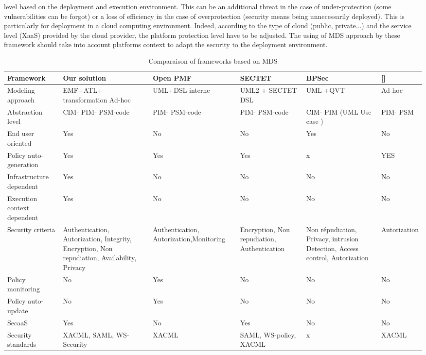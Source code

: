 \documentclass[runningheads,a4paper]{llncs}
\begin{document}
level based on the deployment and execution environment. This can be an additional threat in the case of under-protection (some vulnerabilities can be forgot) or a loss of efficiency in the case of overprotection (security means being unnecessarily deployed). This is particularly for deployment in a cloud computing environment. Indeed, according to the type of cloud (public, private...) and the service level (XaaS) provided by the cloud provider, the platform protection level have to be adjusted. The using of MDS approach by these framework should take into account platforms context to adapt the security to the deployment environment.


\begin{landscape}
\begin{table}

\caption{Comparaison of frameworks based on MDS}
\begin{tabular}{@{}*{6}{|p{3.1cm}}|@{} }
\hline\noalign{\smallskip}
Framework & Our solution   & Open PMF & SECTET & BPSec & []\\[0.2cm]
  \hline
  Modeling approach & EMF+ATL+ transformation Ad-hoc  & UML+DSL interne & UML2 + SECTET DSL & UML +QVT & Ad hoc\\
  Abstraction level & CIM- PIM- PSM-code  &  PIM- PSM-code  &  PIM- PSM-code &  CIM- PIM (UML Use case )&  PIM- PSM\\
  End user oriented & Yes & No & No & Yes & No\\
  Policy auto-generation & Yes & Yes & Yes & x & YES\\
  Infrastructure dependent & Yes & No & No & No & No\\
  Execution context dependent & Yes & No & No & No & No\\
  Security criteria &  Authentication, Autorization,  Integrity, Encryption, Non repudiation, Availability, Privacy & Authentication, Autorization,Monitoring & Encryption, Non repudiation, Authentication & Non  r\'epudiation, 
Privacy,  intrusion Detection,  Access control, Autorization & Autorization \\
  Policy monitoring & No & Yes & No & No & No\\
  Policy auto-update & No & Yes & No & No & No\\
  SecaaS & Yes & No & Yes & No & No\\
  Security standards  & XACML,  SAML,  WS-Security & XACML  & SAML,  WS-policy, XACML & x & XACML\\

\hline
\end{tabular}
\end{table}
\end{landscape}
\end{document}
